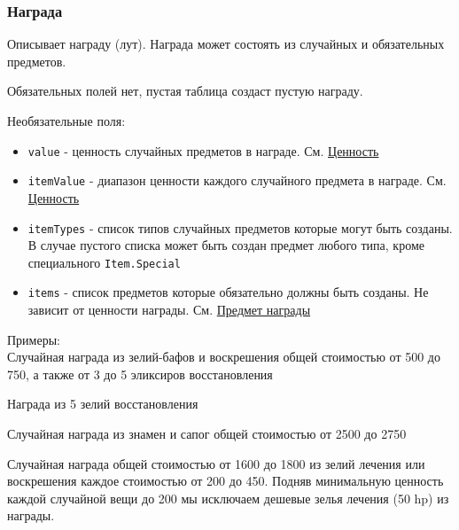 \subsubsection{Награда}
\label{loot}
Описывает награду (лут). Награда может состоять из случайных и обязательных предметов.

Обязательных полей нет, пустая таблица создаст пустую награду.

Необязательные поля:
\begin{itemize}
\item \texttt{value} - ценность случайных предметов в награде. См. \hyperref[value]{Ценность}
\item \texttt{itemValue} - диапазон ценности каждого случайного предмета в награде. См. \hyperref[value]{Ценность}
\item \texttt{itemTypes} - список типов случайных предметов которые могут быть созданы. В случае пустого списка может быть создан предмет любого типа, кроме специального \texttt{Item.Special}
\item \texttt{items} - список предметов которые обязательно должны быть созданы. Не зависит от ценности награды. См. \hyperref[item]{Предмет награды}
\end{itemize}

Примеры:\\
Случайная награда из зелий-бафов и воскрешения общей стоимостью от 500 до 750,
а также от 3 до 5 эликсиров восстановления

\begin{figure}[H]

\end{figure}

Награда из 5 зелий восстановления

\begin{figure}[H]

\end{figure}

Случайная награда из знамен и сапог общей стоимостью от 2500 до 2750

\begin{figure}[H]

\end{figure}

Случайная награда общей стоимостью от 1600 до 1800 
из зелий лечения или воскрешения каждое стоимостью от 200 до 450. 
Подняв минимальную ценность каждой случайной вещи до 200 
мы исключаем дешевые зелья лечения (50 hp) из награды.

\begin{figure}[H]

\end{figure}